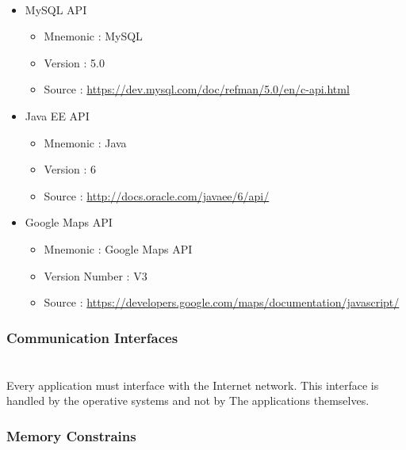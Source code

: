 \paragraph{} 

\begin{itemize}
	\item MySQL API
	\begin{itemize}
		\item Mnemonic : MySQL
		\item Version : 5.0
		\item Source : \url{https://dev.mysql.com/doc/refman/5.0/en/c-api.html}
	\end{itemize}

	\item Java EE API
	\begin{itemize}
		\item Mnemonic : Java
		\item Version : 6
		\item Source : \url{http://docs.oracle.com/javaee/6/api/}
	\end{itemize}

	\item Google Maps API
	\begin{itemize}
		\item Mnemonic : Google Maps API
		\item Version Number : V3
		\item Source : \url{https://developers.google.com/maps/documentation/javascript/}
	\end{itemize}

\end{itemize}

\subsubsection{Communication Interfaces} 
\label{ssub:communication_interfaces}
\paragraph{}\mbox{} \\
Every application must interface with the Internet network. This interface is handled by the operative systems and not by The applications themselves.

\subsubsection{Memory Constrains} 

